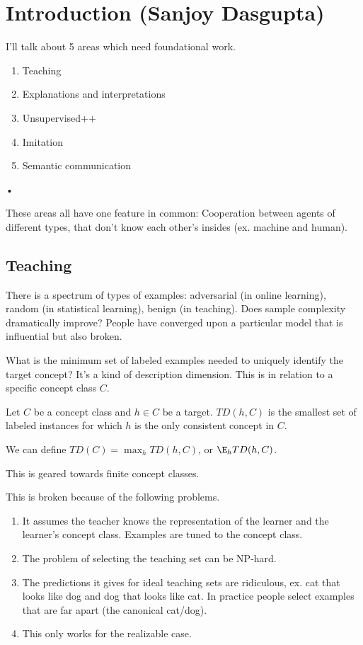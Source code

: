\section{Introduction (Sanjoy Dasgupta)}

I'll talk about 5 areas which need foundational work.
\begin{enumerate}
\item
Teaching
\item
Explanations and interpretations
\item
Unsupervised++
\item
Imitation
\item
Semantic communication
\end{enumerate}•

These areas all have one feature in common: Cooperation between agents of different types, that don't know each other's insides (ex. machine and human).
\subsection{Teaching}

There is a spectrum of types of examples: adversarial (in online learning), random (in statistical learning), benign (in teaching). Does sample complexity dramatically improve?
People have converged upon a particular model that is influential but also broken.

What is the minimum set of labeled examples needed to uniquely identify the target concept? It's a kind of description dimension.
This is in relation to a specific concept class $C$.  
\begin{df}
Let $C$ be a concept class and $h\in C$ be a target. $TD(h,C)$ is the smallest set of labeled instances for which $h$ is the only consistent concept in $C$.
\end{df}
We can define $TD(C) = \max_h TD(h,C)$, or $\E_h TD(h,C)$. 

This is geared towards finite concept classes.

This is broken because of the following problems.
\begin{enumerate}
\item
It assumes the teacher knows the representation of the learner and the learner's concept class. Examples are tuned to the concept class.
\item
The problem of selecting the teaching set can be NP-hard.
\item
The predictions it gives for ideal teaching sets are ridiculous, ex. cat that looks like dog and dog that looks like cat. In practice people select examples that are far apart (the canonical cat/dog).


\item
This only works for the realizable case.
\end{enumerate}

